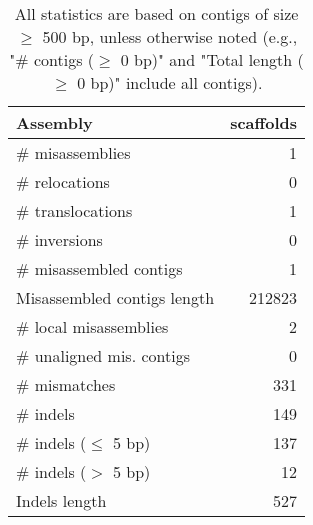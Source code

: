 \documentclass[12pt,a4paper]{article}
\begin{document}
\begin{table}[ht]
\begin{center}
\caption{All statistics are based on contigs of size $\geq$ 500 bp, unless otherwise noted (e.g., "\# contigs ($\geq$ 0 bp)" and "Total length ($\geq$ 0 bp)" include all contigs).}
\begin{tabular}{|l*{1}{|r}|}
\hline
Assembly & scaffolds \\ \hline
\# misassemblies & 1 \\ \hline
\hspace{5mm}\# relocations & 0 \\ \hline
\hspace{5mm}\# translocations & 1 \\ \hline
\hspace{5mm}\# inversions & 0 \\ \hline
\# misassembled contigs & 1 \\ \hline
Misassembled contigs length & 212823 \\ \hline
\# local misassemblies & 2 \\ \hline
\# unaligned mis. contigs & 0 \\ \hline
\# mismatches & 331 \\ \hline
\# indels & 149 \\ \hline
\hspace{5mm}\# indels ($\leq$ 5 bp) & 137 \\ \hline
\hspace{5mm}\# indels ($>$ 5 bp) & 12 \\ \hline
Indels length & 527 \\ \hline
\end{tabular}
\end{center}
\end{table}
\end{document}
